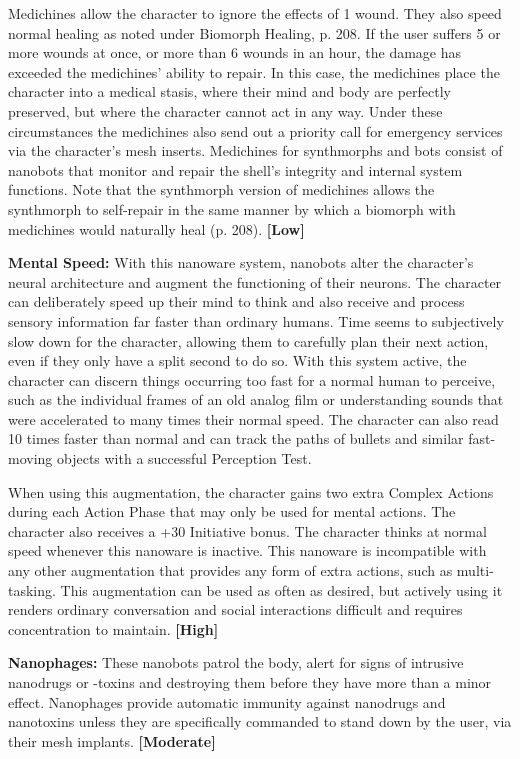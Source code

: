 Medichines allow the character to ignore the effects of 1 wound. They also speed normal healing as noted under Biomorph Healing, p. 208. If the user suffers 5 or more wounds at once, or more than 6 wounds in an hour, the damage has exceeded the medichines’ ability to repair. In this case, the medichines place the character into a medical stasis, where their mind and body are perfectly preserved, but where the character cannot act in any way. Under these circumstances the medichines also send out a priority call for emergency services via the character’s mesh inserts. Medichines for synthmorphs and bots consist of nanobots that monitor and repair the shell’s integrity and internal system functions. Note that the synthmorph version of medichines allows the synthmorph to self-repair in the same manner by which a biomorph with medichines would naturally heal (p. 208). \textbf{[Low]} 

\textbf{Mental Speed:} With this nanoware system, nanobots alter the character’s neural architecture and augment the functioning of their neurons. The character can deliberately speed up their mind to think and also receive and process sensory information far faster than ordinary humans. Time seems to subjectively slow down for the character, allowing them to carefully plan their next action, even if they only have a split second to do so. With this system active, the character can discern things occurring too fast for a normal human to perceive, such as the individual frames of an old analog film or understanding sounds that were accelerated to many times their normal speed. The character can also read 10 times faster than normal and can track the paths of bullets and similar fast-moving objects with a successful Perception Test. 

When using this augmentation, the character gains two extra Complex Actions during each Action Phase that may only be used for mental actions. The character also receives a +30 Initiative bonus. The character thinks at normal speed whenever this nanoware is inactive. This nanoware is incompatible with any other augmentation that provides any form of extra actions, such as multi-tasking. This augmentation can be used as often as desired, but actively using it renders ordinary conversation and social interactions difficult and requires concentration to maintain. \textbf{[High]} 

\textbf{Nanophages:} These nanobots patrol the body, alert for signs of intrusive nanodrugs or -toxins and destroying them before they have more than a minor effect. Nanophages provide automatic immunity against nanodrugs and nanotoxins unless they are specifically commanded to stand down by the user, via their mesh implants. \textbf{[Moderate]} 


